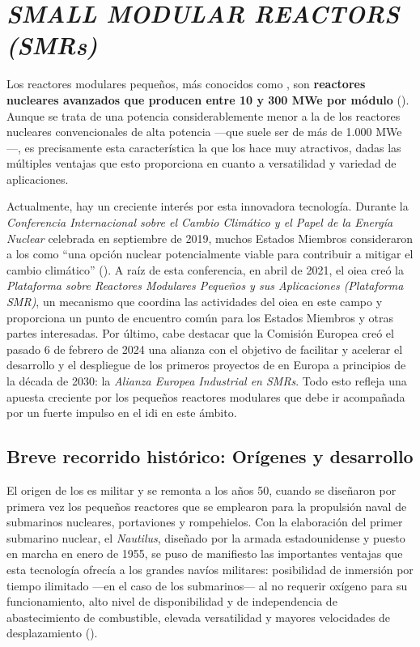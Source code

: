 \newpage
\section{\emph{SMALL MODULAR REACTORS (SMRs)}} \label{small_modular_reactors}

Los reactores modulares pequeños, más conocidos como , son \textbf{reactores nucleares avanzados que producen entre 10 y 300 MWe por módulo} (\cite{nea_smrs_2021}). Aunque se trata de una potencia considerablemente menor a la de los reactores nucleares convencionales de alta potencia ---que suele ser de más de 1.000 MWe---, es precisamente esta característica la que los hace muy atractivos, dadas las múltiples ventajas que esto proporciona en cuanto a versatilidad y variedad de aplicaciones.

Actualmente, hay un creciente interés por esta innovadora tecnología. Durante la \emph{Conferencia Internacional sobre el Cambio Climático y el Papel de la Energía Nuclear} celebrada en septiembre de 2019, muchos Estados Miembros consideraron a los  como ``una opción nuclear potencialmente viable para contribuir a mitigar el cambio climático'' (\cite{oiea_informe_2019}). A raíz de esta conferencia, en abril de 2021, el \acrfull{oiea} creó la \emph{Plataforma sobre Reactores Modulares Pequeños y sus Aplicaciones (Plataforma SMR)}, un mecanismo que coordina las actividades del \acrshort{oiea} en este campo y proporciona un punto de encuentro común para los Estados Miembros y otras partes interesadas. Por último, cabe destacar que la Comisión Europea creó el pasado 6 de febrero de 2024 una alianza con el objetivo de facilitar y acelerar el desarrollo y el despliegue de los primeros proyectos de  en Europa a principios de la década de 2030: la \emph{Alianza Europea Industrial en SMRs}. Todo esto refleja una apuesta creciente por los pequeños reactores modulares que debe ir acompañada por un fuerte impulso en el \acrshort{idi} en este ámbito.

\subsection{Breve recorrido histórico: Orígenes y desarrollo}

El origen de los  es militar y se remonta a los años 50, cuando se diseñaron por primera vez los pequeños reactores que se emplearon para la propulsión naval de submarinos nucleares, portaviones y rompehielos. Con la elaboración del primer submarino nuclear, el \emph{Nautilus}, diseñado por la armada estadounidense y puesto en marcha en enero de 1955, se puso de manifiesto las importantes ventajas que esta tecnología ofrecía a los grandes navíos militares: posibilidad de inmersión por tiempo ilimitado ---en el caso de los submarinos--- al no requerir oxígeno para su funcionamiento, alto nivel de disponibilidad y de independencia de abastecimiento de combustible, elevada versatilidad y mayores velocidades de desplazamiento (\cite{propulsion_naval_nuclear}).

